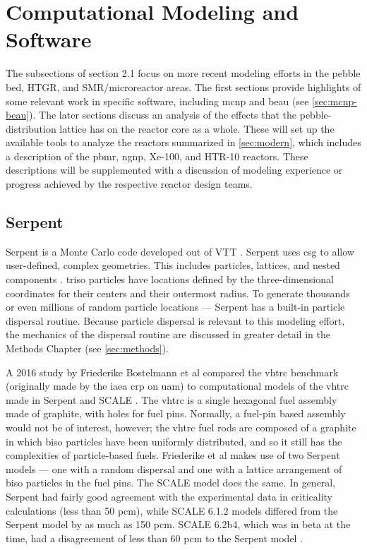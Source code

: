 
\section{Computational Modeling and Software}

The subsections of section 2.1 focus on more recent modeling efforts in the pebble bed, HTGR, and SMR/microreactor areas.  The first sections provide highlights of some relevant work in specific software, including \acrfull{mcnp} \cite{werner_mcnp_2017} and \acrfull{beau} \cite{cisneros_pebble_2013} (see \autoref{sec:mcnp-beau}).  The later sections discuss an analysis of the effects that the pebble-distribution lattice has on the reactor core as a whole.  These will set up the available tools to analyze the reactors summarized in \autoref{sec:modern}, which includes a description of the \acrfull{pbmr}, \acrfull{ngnp}, Xe-100, and HTR-10 reactors.  These descriptions will be supplemented with a discussion of modeling experience or progress achieved by the respective reactor design teams.

\subsection{Serpent}

Serpent is a Monte Carlo code developed out of VTT \cite{leppanen_serpent_2015}. Serpent uses \acrfull{csg} to allow user-defined, complex geometries.  This includes particles, lattices, and nested components \cite{leppanen_serpent_2015}.  \acrshort{triso} particles have locations defined by the three-dimensional coordinates for their centers and their outermost radius. To generate thousands or even millions of random particle locations --- Serpent has a built-in particle dispersal routine.  Because particle dispersal is relevant to this modeling effort, the mechanics of the dispersal routine are discussed in greater detail in the Methods Chapter (see \autoref{sec:methods}).

A 2016 study by Friederike Bostelmann et al compared the \acrfull{vhtrc} \cite{difilippo_applications_1994} benchmark (originally made by the \acrfull{iaea} \acrfull{crp} on \acrfull{uam}) to computational models of the \acrshort{vhtrc} made in Serpent and SCALE \cite{bostelmann_criticality_2016}.  The \acrshort{vhtrc} is a single hexagonal fuel assembly made of graphite, with holes for fuel pins.  Normally, a fuel-pin based assembly would not be of interest, however; the \acrshort{vhtrc} fuel rods are composed of a graphite in which \acrshort{biso} particles have been uniformly distributed, and so it still has the complexities of particle-based fuels.  Friederike et al makes use of two Serpent models --- one with a random dispersal and one with a lattice arrangement of \acrshort{biso} particles in the fuel pins.  The SCALE model does the same.  In general, Serpent had fairly good agreement with the experimental data in criticality calculations (less than 50 pcm), while SCALE 6.1.2 models differed from the Serpent model by as much as 150 pcm.  SCALE 6.2b4, which was in beta at the time, had a disagreement of less than 60 pcm to the Serpent model \cite{bostelmann_criticality_2016}.

